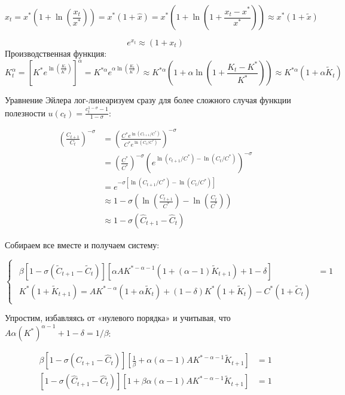 \documentclass[a4paper,12pt]{article}
\begin{document}
{\[x_t = x^* \left( 1 + \ln \left( \frac{x_t}{x^*} \right) \right) = x^*(1 + \hat{x}) = x^* \left( 1 + \ln \left( 1 + \frac{x_t - x^*}{x^*} \right) \right) \approx x^*(1 + \tilde{x})\]

\[e^{x_t} \approx (1 + x_t)\]
Производственная функция:
\[
K_{t}^{\alpha} = \left[ K^{*} e^{\ln\left( \frac{K_{t}}{K^{*}} \right)} \right]^{\alpha} 
= K^{*\alpha} e^{\alpha \ln\left( \frac{K_{t}}{K^{*}} \right)} 
\approx K^{*\alpha} \left( 1 + \alpha \ln\left( 1 + \frac{K_{t} - K^{*}}{K^{*}} \right) \right) 
\approx K^{*\alpha} (1 + \alpha \widetilde{K}_{t})
\]


Уравнение Эйлера лог-линеаризуем сразу для более сложного случая функции полезности \( u(c_t) = \frac{c_t^{1-\sigma}-1}{1-\sigma} \):

\[
\begin{aligned}
\left( \frac{C_{t+1}}{C_t} \right)^{-\sigma} 
&= \left( \frac{C^* e^{\ln(C_{t+1}/C^*)}}{C^* e^{\ln(C_t/C^*)}} \right)^{-\sigma} \\
&= \left( \frac{C^*}{C^*} \right)^{-\sigma} \left( e^{\ln(c_{t+1}/C^*) - \ln(C_t/C^*)} \right)^{-\sigma} \\
&= e^{-\sigma \left[ \ln(C_{t+1}/C^*) - \ln(C_t/C^*) \right]} \\
&\approx 1 - \sigma \left( \ln\left(\frac{C_{t+1}}{C^*}\right) - \ln\left(\frac{C_t}{C^*}\right) \right) \\
&\approx 1 - \sigma (\hat{C}_{t+1} - \hat{C}_t)
\end{aligned}
\]

Собираем все вместе и получаем систему:

\begin{equation}
    \begin{cases}
    \begin{alignedat}{2}
    \beta \left[ 1 - \sigma (\tilde{C}_{t+1} - \tilde{C}_t) \right] \left[ \alpha A K^{*-\alpha-1} \left( 1 + (\alpha - 1)\tilde{K}_{t+1} \right) + 1 - \delta \right] &= 1 \\
    K^*(1 + \tilde{K}_{t+1}) = A K^{*-\alpha} (1 + \alpha \tilde{K}_t) + (1 - \delta) K^*(1 + \tilde{K}_t) - C^*(1 + \tilde{C}_t)
    \end{alignedat}
    \end{cases}
    \label{eq:system_dynamic_2}
\end{equation}

Упростим, избавляясь от «нулевого порядка» и учитывая, что \( A\alpha(K^*)^{\alpha-1} + 1 - \delta = 1/\beta \):

\[
\begin{aligned}
\beta \left[1 - \sigma (\hat{C}_{t+1} - \hat{C}_t)\right] \left[ \frac{1}{\beta} + \alpha (\alpha - 1) A K^{*-\alpha-1} \tilde{K}_{t+1} \right] &= 1 \\
\left[1 - \sigma (\hat{C}_{t+1} - \hat{C}_t)\right] \left[1 + \beta \alpha (\alpha - 1) A K^{*-\alpha-1} \tilde{K}_{t+1}\right] &= 1
\end{aligned}
\]

}
\end{document}
